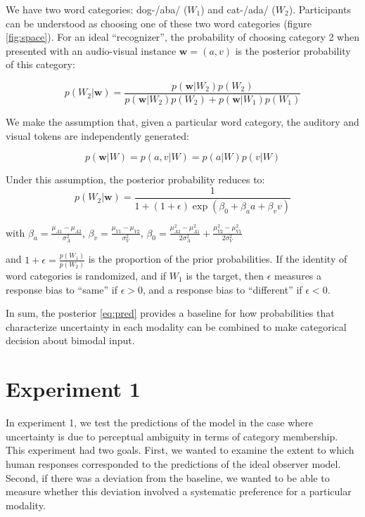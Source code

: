 \documentclass[10pt,letterpaper]{article}
\begin{document}
We have two word categories: dog-/aba/ ($W_1$) and cat-/ada/ ($W_2$). Participants can be understood as choosing one of these two word categories (figure \ref{fig:space}). For an ideal ``recognizer'', the probability of choosing category 2 when presented with an audio-visual instance $\mathbf{w}=(a,v)$ is the posterior probability of this category:

\begin{equation}
p(W_2 | \mathbf{w})=\frac{p(\mathbf{w}|W_2)p(W_2)}{p(\mathbf{w}|W_2)p(W_2)+p(\mathbf{w}|W_1)p(W_1)}
\end{equation}

We make the assumption that, given a particular word category, the auditory and visual tokens are independently generated:

\begin{equation}
p(\mathbf{w} | W) = p(a,v| W) = p(a| W)p(v| W)
\end{equation}

Under this assumption, the posterior probability reduces to:
\begin{equation}
p(W_2 | \mathbf{w})=\frac{1}{1+(1+\epsilon)\exp(\beta_0+\beta_aa+\beta_vv)}
\label{eq:pred}
\end{equation}

with $\beta_a=\frac{\mu_{A1}-\mu_{A2}}{\sigma^2_{A}}$,
$\beta_v=\frac{\mu_{V1}-\mu_{V2}}{\sigma^2_{V}}$,
$\beta_0=\frac{\mu^2_{A2}-\mu^2_{A1}}{2\sigma^2_{A}}+\frac{\mu^2_{V2}-\mu^2_{V1}}{2\sigma^2_{V}}$

and $1+\epsilon=\frac{p(W_1)}{p(W_2)}$ is the proportion of the prior probabilities. If the identity of word categories is randomized, and if $W_1$ is the target, then $\epsilon$ measures a response bias to ``same'' if $\epsilon > 0 $, and a response bias to ``different'' if $\epsilon < 0 $.

In sum, the posterior \ref{eq:pred} provides a baseline for how probabilities that characterize uncertainty in each modality can be combined to make categorical decision about bimodal input.


\section{Experiment 1}

In experiment 1, we test the predictions of the model in the case where uncertainty is due to perceptual ambiguity in terms of category membership. This experiment had two goals. First, we wanted to examine the extent to which human responses corresponded to the predictions of the ideal observer model. Second, if there was a deviation from the baseline, we wanted to be able to measure whether this deviation involved a systematic preference for a particular modality.
\end{document}
